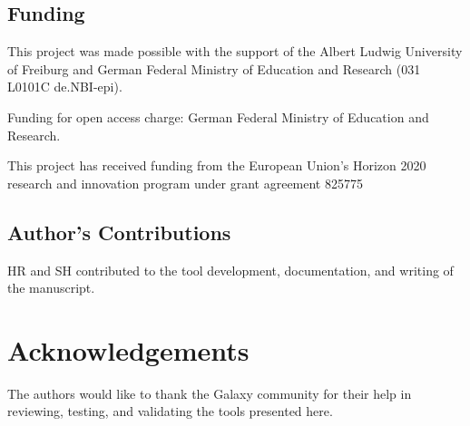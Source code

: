 \subsection*{Funding}
This project was made possible with the support of the Albert Ludwig University of Freiburg and German Federal Ministry of Education and Research (031 L0101C de.NBI-epi).

Funding for open access charge: German Federal Ministry of Education and Research.

This project has received funding from the European Union’s Horizon 2020 research and innovation program under grant agreement 825775

\subsection*{Author's Contributions}

HR and SH contributed to the tool development, documentation, and writing of the manuscript.

\section*{Acknowledgements}

The authors would like to thank the Galaxy community for their help in reviewing, testing, and validating the tools presented here.

\footnotesize


\normalsize
